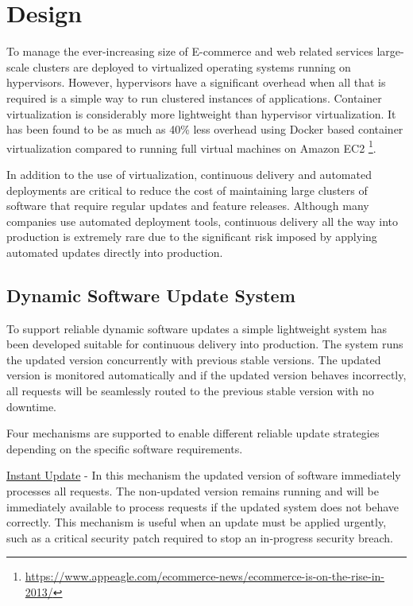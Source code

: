 \documentclass[a4paper,11pt,twoside]{article}
\begin{document}
\clearpage
\section{Design} \label{Design}
To manage the ever-increasing size of E-commerce and web related services large-scale clusters are deployed to virtualized operating systems running on hypervisors. However, hypervisors have a significant overhead when all that is required is a simple way to run clustered instances of applications. Container virtualization is considerably more lightweight than hypervisor virtualization. It has been found to be as much as 40\% less overhead using Docker based container virtualization compared to running full virtual machines on Amazon EC2 \footnote{\url{https://www.appeagle.com/ecommerce-news/ecommerce-is-on-the-rise-in-2013/}}.

In addition to the use of virtualization, continuous delivery and automated deployments are critical to reduce the cost of maintaining large clusters of software that require regular updates and feature releases. Although many companies use automated deployment tools, continuous delivery all the way into production is extremely rare due to the significant risk imposed by applying automated updates directly into production.

\subsection{Dynamic Software Update System}\label{modes} 
To support reliable dynamic software updates a simple lightweight system has been developed suitable for continuous delivery into production. The system runs the updated version concurrently with previous stable versions. The updated version is monitored automatically and if the updated version behaves incorrectly, all requests will be seamlessly routed to the previous stable version with no downtime.

Four mechanisms are supported to enable different reliable update strategies depending on the specific software requirements.

\underline{Instant Update} -  In this mechanism the updated version of software immediately processes all requests. The non-updated version remains running and will be immediately available to process requests if the updated system does not behave correctly. This mechanism is useful when an update must be applied urgently, such as a critical security patch required to stop an in-progress security breach.
\end{document}
